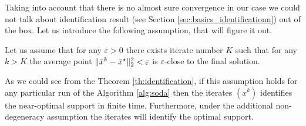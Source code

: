 Taking into account that there is no almost sure convergence in our case we could not talk about identification result \cite{fadili2018sensitivity} (see Section \ref{sec:basics_identificationn}) out of the box. Let us introduce the following assumption, that will figure it out.

\begin{assumption}[On convergence]\label{hyp:conv}
Let us assume that for any $\varepsilon > 0$ there exists iterate number $K$ such that for any $k>K$ the average point $\|\bar{x}^k-\bar{x}^{\star}\|_2^2<\varepsilon$ is $\varepsilon$-close to the final solution.
\end{assumption}

As we could see from the Theorem \ref{th:identification}, if this assumption holds for any particular run of the Algorithm \ref{alg:soda} then the iterates $(x^k)$ identifies the near-optimal support in finite time. Furthermore, under the additional non-degeneracy assumption the iterates will identify the optimal support. 

